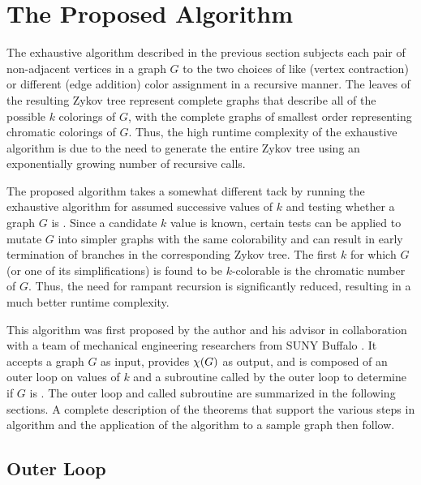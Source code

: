 \section{The Proposed Algorithm}

The exhaustive algorithm described in the previous section subjects each pair of non-adjacent vertices in a graph
\(G\) to the two choices of like (vertex contraction) or different (edge addition) color assignment in a recursive
manner.  The leaves of the resulting Zykov tree represent complete graphs that describe all of the possible \(k\)
colorings of \(G\), with the complete graphs of smallest order representing chromatic colorings of \(G\).  Thus,
the high runtime complexity of the exhaustive algorithm is due to the need to generate the entire Zykov tree using
an exponentially growing number of recursive calls.

The proposed algorithm takes a somewhat different tack by running the exhaustive algorithm for assumed successive
values of \(k\) and testing whether a graph \(G\) is .  Since a candidate \(k\) value is known,
certain tests can be applied to mutate \(G\) into simpler graphs with the same colorability and can result in early
termination of branches in the corresponding Zykov tree.  The first \(k\) for which \(G\) (or one of its
simplifications) is found to be \(k\)-colorable is the chromatic number of \(G\).  Thus, the need for rampant
recursion is significantly reduced, resulting in a much better runtime complexity.

This algorithm was first proposed by the author and his advisor in collaboration with a team of mechanical
engineering researchers from SUNY Buffalo \cite{cavallaro}.  It accepts a graph \(G\) as input, provides \(\chi(G)\)
as output, and is composed of an outer loop on values of \(k\) and a subroutine called by the outer loop to
determine if \(G\) is .  The outer loop and called subroutine are summarized in the following
sections.  A complete description of the theorems that support the various steps in algorithm and the application
of the algorithm to a sample graph then follow.

\subsection{Outer Loop}

